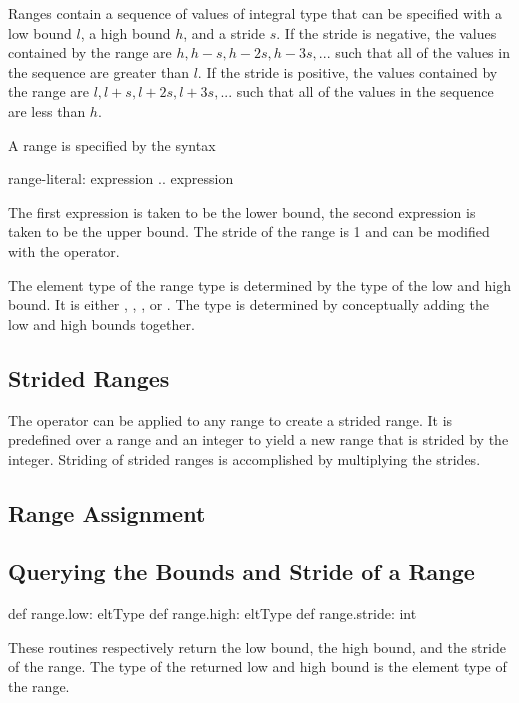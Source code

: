 \label{Ranges}

Ranges contain a sequence of values of integral type that can be
specified with a low bound $l$, a high bound $h$, and a stride $s$.
If the stride is negative, the values contained by the range are $h,
h-s, h-2s, h-3s, ...$ such that all of the values in the sequence are
greater than $l$.  If the stride is positive, the values contained by
the range are $l, l+s, l+2s, l+3s, ...$ such that all of the values in
the sequence are less than $h$.

A range is specified by the syntax
\begin{syntax}
range-literal:
  expression .. expression
\end{syntax}
The first expression is taken to be the lower bound, the second
expression is taken to be the upper bound.  The stride of the
range is 1 and can be modified with the 
operator.

The element type of the range type is determined by the
type of the low and high bound.  It is
either , , , or .  The
type is determined by conceptually adding the low and high bounds
together.

\subsection{Strided Ranges}
\label{Strided_Ranges}

The  operator can be applied to any range to create a strided
range.  It is predefined over a range and an integer to yield a new
range that is strided by the integer.  Striding of strided ranges is
accomplished by multiplying the strides.

\subsection{Range Assignment}
\label{Range_Assignment}

\subsection{Querying the Bounds and Stride of a Range}

\begin{protohead}
def range.low: eltType
def range.high: eltType
def range.stride: int
\end{protohead}
\begin{protobody}
These routines respectively return the low bound, the high bound, and
the stride of the range.  The type of the returned low and high bound
is the element type of the range.
\end{protobody}

